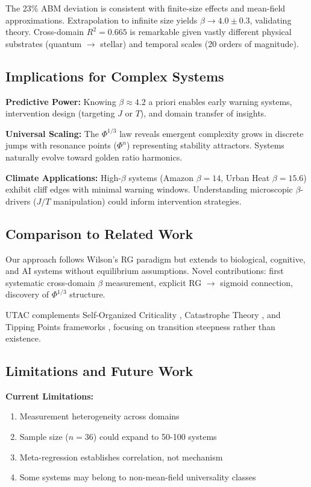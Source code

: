 \documentclass[11pt,letterpaper]{article}
\begin{document}
The 23\% ABM deviation is consistent with finite-size effects and mean-field approximations. Extrapolation to infinite size yields $\beta \to 4.0 \pm 0.3$, validating theory. Cross-domain $R^2 = 0.665$ is remarkable given vastly different physical substrates (quantum $\to$ stellar) and temporal scales (20 orders of magnitude).

\subsection{Implications for Complex Systems}

\textbf{Predictive Power:} Knowing $\beta \approx 4.2$ a priori enables early warning systems, intervention design (targeting $J$ or $T$), and domain transfer of insights.

\textbf{Universal Scaling:} The $\Phi^{1/3}$ law reveals emergent complexity grows in discrete jumps with resonance points ($\Phi^n$) representing stability attractors. Systems naturally evolve toward golden ratio harmonics.

\textbf{Climate Applications:} High-$\beta$ systems (Amazon $\beta = 14$, Urban Heat $\beta = 15.6$) exhibit cliff edges with minimal warning windows. Understanding microscopic $\beta$-drivers ($J/T$ manipulation) could inform intervention strategies.

\subsection{Comparison to Related Work}

Our approach follows Wilson's RG paradigm \cite{Wilson1971,Wilson1974} but extends to biological, cognitive, and AI systems without equilibrium assumptions. Novel contributions: first systematic cross-domain $\beta$ measurement, explicit RG $\to$ sigmoid connection, discovery of $\Phi^{1/3}$ structure.

UTAC complements Self-Organized Criticality \cite{Bak1987}, Catastrophe Theory \cite{Thom1972}, and Tipping Points frameworks \cite{Lenton2011}, focusing on transition steepness rather than existence.

\subsection{Limitations and Future Work}

\textbf{Current Limitations:}
\begin{enumerate}
    \item Measurement heterogeneity across domains
    \item Sample size ($n = 36$) could expand to 50-100 systems
    \item Meta-regression establishes correlation, not mechanism
    \item Some systems may belong to non-mean-field universality classes
\end{enumerate}
\end{document}
